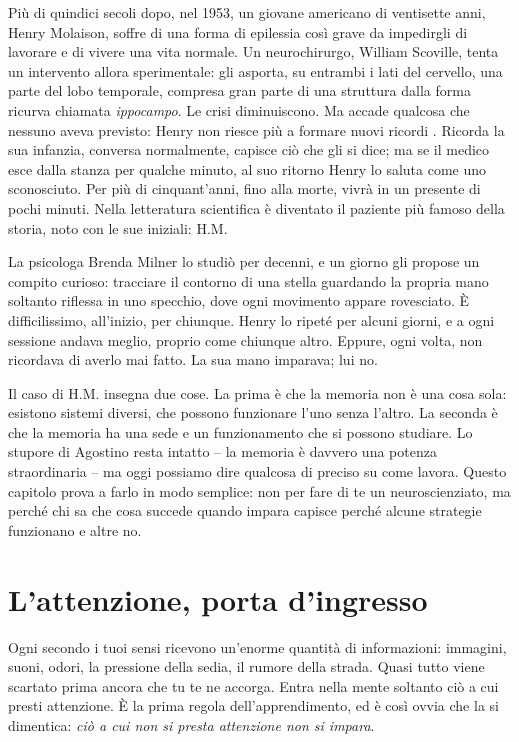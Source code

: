 Più di quindici secoli dopo, nel 1953, un giovane americano di
ventisette anni, Henry Molaison, soffre di una forma di epilessia così
grave da impedirgli di lavorare e di vivere una vita normale. Un
neurochirurgo, William Scoville, tenta un intervento allora
sperimentale: gli asporta, su entrambi i lati del cervello, una parte
del lobo temporale, compresa gran parte di una struttura dalla forma
ricurva chiamata \emph{ippocampo}. Le crisi diminuiscono. Ma accade
qualcosa che nessuno aveva previsto: Henry non riesce più a formare
nuovi ricordi \parencite{scoville1957}. Ricorda la sua infanzia,
conversa normalmente, capisce ciò che gli si dice; ma se il medico esce
dalla stanza per qualche minuto, al suo ritorno Henry lo saluta come
uno sconosciuto. Per più di cinquant'anni, fino alla morte, vivrà in un
presente di pochi minuti. Nella letteratura scientifica è diventato il
paziente più famoso della storia, noto con le sue iniziali: H.M.

La psicologa Brenda Milner lo studiò per decenni, e un giorno gli
propose un compito curioso: tracciare il contorno di una stella
guardando la propria mano soltanto riflessa in uno specchio, dove ogni
movimento appare rovesciato. È difficilissimo, all'inizio, per
chiunque. Henry lo ripeté per alcuni giorni, e a ogni sessione andava
meglio, proprio come chiunque altro. Eppure, ogni volta, non ricordava
di averlo mai fatto. La sua mano imparava; lui no.

Il caso di H.M. insegna due cose. La prima è che la memoria non è una
cosa sola: esistono sistemi diversi, che possono funzionare l'uno senza
l'altro. La seconda è che la memoria ha una sede e un funzionamento
che si possono studiare. Lo stupore di Agostino resta intatto -- la
memoria è davvero una potenza straordinaria -- ma oggi possiamo dire
qualcosa di preciso su come lavora. Questo capitolo prova a farlo in
modo semplice: non per fare di te un neuroscienziato, ma perché chi sa
che cosa succede quando impara capisce perché alcune strategie
funzionano e altre no.

\section{L'attenzione, porta d'ingresso}

Ogni secondo i tuoi sensi ricevono un'enorme quantità di informazioni:
immagini, suoni, odori, la pressione della sedia, il rumore della
strada. Quasi tutto viene scartato prima ancora che tu te ne accorga.
Entra nella mente soltanto ciò a cui presti attenzione. È la prima
regola dell'apprendimento, ed è così ovvia che la si dimentica:
\emph{ciò a cui non si presta attenzione non si impara}.

